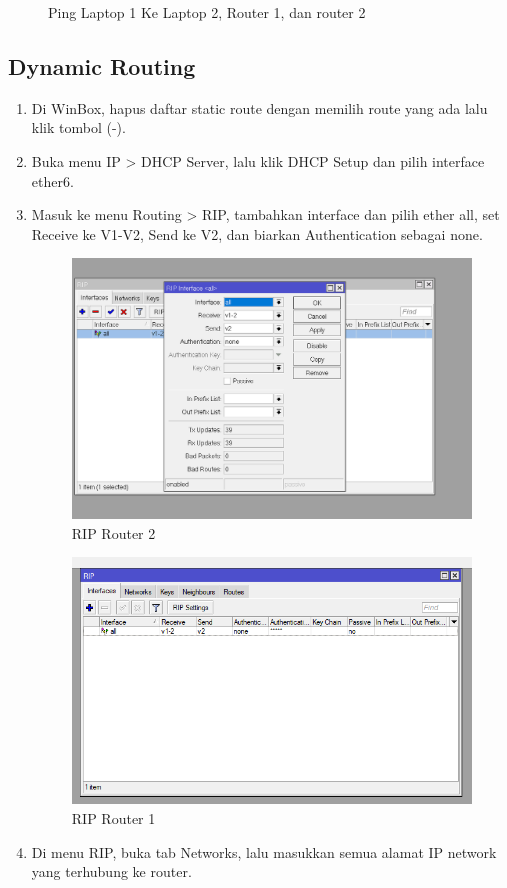 \begin{enumerate}
\begin{figure}[H]
        \caption{Ping Laptop 1 Ke Laptop 2, Router 1, dan router 2}
        \label{fig:enter-label}
    \end{figure}
\end{enumerate}

\subsection{Dynamic Routing}
\begin{enumerate}
    \item Di WinBox, hapus daftar static route dengan memilih route yang ada lalu klik tombol (-).
    \item Buka menu IP > DHCP Server, lalu klik DHCP Setup dan pilih interface ether6.
    \item Masuk ke menu Routing > RIP, tambahkan interface dan pilih ether all, set Receive ke V1-V2, Send ke V2, dan biarkan Authentication sebagai none.
    \begin{figure}[H]
        \centering
        \includegraphics[width=0.5\linewidth]{RIP Router 2.png}
        \caption{RIP Router 2}
        \label{fig:enter-label}
    \end{figure}
    \begin{figure}[H]
        \centering
        \includegraphics[width=0.5\linewidth]{rip interfaces.png}
        \caption{RIP Router 1}
        \label{fig:enter-label}
    \end{figure}
    \item Di menu RIP, buka tab Networks, lalu masukkan semua alamat IP network yang terhubung ke router.
    \begin{figure}[H]
        \centering

\end{figure}
\end{enumerate}
